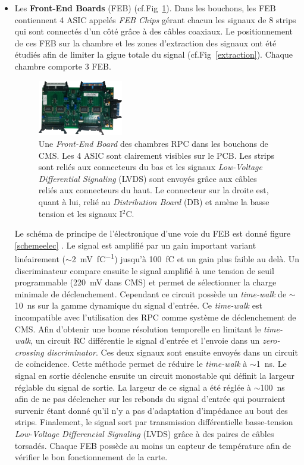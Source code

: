 \begin{itemize}[label=$\bullet$]
	\item Les \textbf{Front-End Boards} (FEB) (cf.Fig~\ref{Feb}). Dans les bouchons, les FEB contiennent \num{4} ASIC appelés \textit{FEB Chips} gérant chacun les signaux de \num{8} strips qui sont connectés d'un côté grâce à des câbles coaxiaux. Le positionnement de ces FEB sur la chambre et les zones d'extraction des signaux ont été étudiés afin de limiter la gigue totale du signal (cf.Fig~\ref{extraction}). Chaque chambre comporte \num{3} FEB.
	
	\begin{figure}[ht!]
		\centering
		\includegraphics[width=0.35\textwidth]{RPC/Feb.png}
		\captionsetup{type=figure}\caption{Une \textit{Front-End Board }des chambres RPC dans les bouchons de CMS. Les \num{4} ASIC sont clairement visibles sur le PCB. Les strips sont reliés aux connecteurs du bas et les signaux \textit{Low-Voltage Differential Signaling} (LVDS) sont envoyés grâce aux câbles reliés aux connecteurs du haut. Le connecteur sur la droite est, quant à lui, relié au \textit{Distribution Board} (DB) et amène la basse tension et les signaux I$^2$C.}
		\label{Feb}
	\end{figure}

	Le schéma de principe de l'électronique d'une voie du FEB est donné figure \ref{schemeelec} \cite{electro}. Le signal est amplifié par un gain important variant linéairement ($\sim$\SI{2}{\milli\volt\per\femto\coulomb}) jusqu'à \SI{100}{\femto\coulomb} et un gain plus faible au delà. Un discriminateur compare ensuite le signal amplifié à une tension de seuil programmable (\SI{220}{\milli\volt} dans CMS) et permet de sélectionner la charge minimale de déclenchement. Cependant ce circuit possède un \textit{time-walk} de $\sim$\SI{10}{\nano\second} sur la gamme dynamique du signal d'entrée. Ce \textit{time-walk} est incompatible avec l'utilisation des RPC comme système de déclenchement de CMS. Afin d'obtenir une bonne résolution temporelle en limitant le \textit{time-walk}, un circuit RC différentie le signal d'entrée et l'envoie dans un \textit{zero-crossing discriminator}. Ces deux signaux sont ensuite envoyés dans un circuit de coïncidence. Cette méthode permet de réduire le \textit{time-walk} à $\sim$\SI{1}{\nano\second}. Le signal en sortie déclenche ensuite un circuit monostable qui définit la largeur réglable du signal de sortie. La largeur de ce signal a été réglée à $\sim$\SI{100}{\nano\second} afin de ne pas déclencher sur les rebonds du signal d'entrée qui pourraient survenir étant donné qu'il n'y a pas d'adaptation d'impédance au bout des strips. Finalement, le signal sort par transmission différentielle basse-tension \textit{Low-Voltage Differencial Signaling} (LVDS) grâce à des paires de câbles torsadés. Chaque FEB possède au moins un capteur de température afin de vérifier le bon fonctionnement de la carte.
	

\end{itemize}
